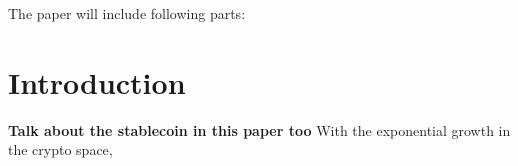 
The paper will include following parts:
\section{Introduction}
\textbf{Talk about the stablecoin in this paper too}
With the exponential growth in the crypto space,

%
%
%
